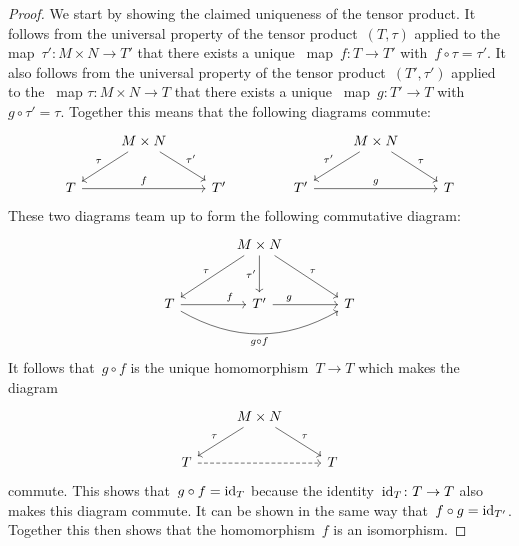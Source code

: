 \begin{proof}
  We start by showing the claimed uniqueness of the tensor product.
  It follows from the universal property of the tensor product~$(T,\tau)$ applied to the~{} map~$\tau' \colon M \times N \to T'$ that there exists a unique~{\klin} map~$f \colon T \to T'$ with~$f \circ \tau = \tau'$.
  It also follows from the universal property of the tensor product~$(T',\tau')$ applied to the~{} map $\tau \colon M \times N \to T$ that there exists a unique~{\klin} map~$g \colon T' \to T$ with~$g \circ \tau' = \tau$.
  Together this means that the following diagrams commute:
  \[
    \begin{tikzcd}
        {}
      & M \times N
        \arrow{dl}[above left]{\tau}
        \arrow{dr}[above right]{\tau'}
      & {}
      \\
        T
        \arrow{rr}{f}
      & {}
      & T'
    \end{tikzcd}
    \qquad\qquad
    \begin{tikzcd}
        {}
      & M \times N
        \arrow{dl}[above left]{\tau'}
        \arrow{dr}[above right]{\tau}
      & {}
      \\
        T'
        \arrow{rr}{g}
      & {}
      & T
    \end{tikzcd}
  \]
  These two diagrams team up to form the following commutative diagram:
  \[
    \begin{tikzcd}[sep = large]
        {}
      & M \times N
        \arrow{dl}[above left]{\tau}
        \arrow{d}[left]{\tau'}
        \arrow{dr}[above right]{\tau}
      & {}
      \\
        T
        \arrow{r}[above, near end]{f}
        \arrow[bend right]{rr}[below]{g \circ f}
      & T'
        \arrow{r}[above, near start]{g}
      & T
    \end{tikzcd}
  \]
  It follows that~$g \circ f$ is the unique homomorphism~$T \to T$ which makes the diagram
  \[
    \begin{tikzcd}
        {}
      & M \times N
        \arrow{dl}[above left]{\tau}
        \arrow{dr}[above right]{\tau}
      & {}
      \\
        T
        \arrow[dashed]{rr}
      & {}
      & T
    \end{tikzcd}
  \]
  commute.
  This shows that~$g \circ f = \mathrm{id}_T$ because the identity~$\mathrm{id}_T \colon T \to T$ also makes this diagram commute.
  It can be shown in the same way that~$f \circ g = \mathrm{id}_{T'}$.
  Together this then shows that the homomorphism~$f$ is an isomorphism.
  

\end{proof}
